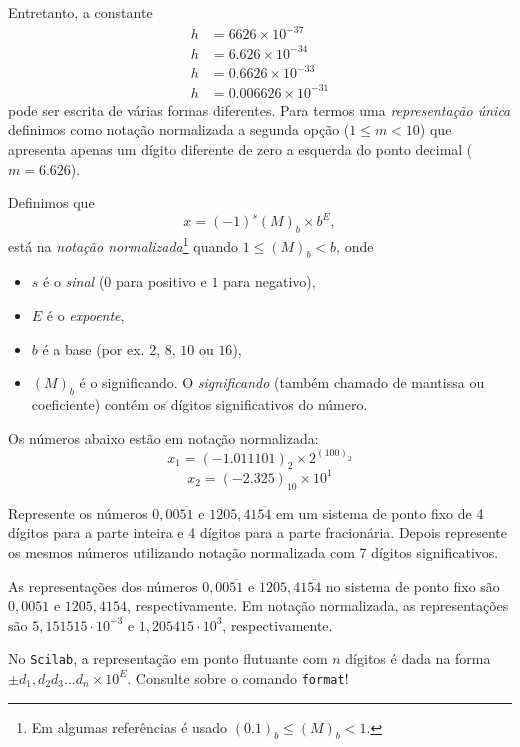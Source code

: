 \documentclass[main.tex]{subfiles}
\begin{document}
Entretanto, a constante
\begin{align*}
   h &=6626  \times 10^{-37} \\
   h &=6.626  \times 10^{-34} \\
   h &=0.6626 \times 10^{-33} \\
   h &=0.006626\times 10^{-31}
\end{align*}
pode ser escrita de várias formas diferentes. Para termos uma \emph{representação única} definimos como notação normalizada a segunda opção ($1 \leq m <10$)
que apresenta apenas um dígito  diferente de zero  a esquerda do ponto decimal ($m=6.626$).

\begin{defn}
Definimos que 
 $$ x=(-1)^{s}(M)_b \times b^{E}, $$
está na \emph{notação normalizada}\footnote{Em algumas referências é usado $(0.1)_b\leq (M)_b <1$.} quando $1\leq (M)_{b}<b$, onde
\begin{itemize}
 \item $s$ é o \emph{sinal} ($0$ para positivo e $1$ para negativo),
 \item $E$ é o \emph{expoente},
 \item $b$ é a base (por ex. $2$, $8$, $10$ ou $16$),
 \item $(M)_b$ é o significando. O \emph{significando} (também chamado de mantissa ou coeficiente) contém os dígitos significativos do número.
\end{itemize}
 
\end{defn}


\begin{ex}
  Os números abaixo estão em notação normalizada:
  $$x_1=(-1.011101)_2\times 2^{(100)_2}$$
  $$x_2=(-2.325)_{10}\times  10^{1}$$
\end{ex}

\begin{ex}Represente os números $0,00\overline{51}$ e $1205,41\overline{54}$ em um sistema de ponto fixo de 4 dígitos para a parte inteira e 4 dígitos para a parte fracionária. Depois represente os mesmos números utilizando notação normalizada com 7 dígitos significativos.
\end{ex}
\begin{sol} As representações dos números $0,00\overline{51}$ e $1205,41\overline{54}$ no sistema de ponto fixo são $0,0051$ e $1205,4154$, respectivamente. Em notação normalizada, as representações são $5,151515\cdot 10^{-3}$ e $1,205415 \cdot 10^{3}$, respectivamente.
\end{sol}
\ifisscilab
\begin{obs}
  No \verb+Scilab+, a representação em ponto flutuante com $n$ dígitos é dada na forma $\pm d_1,d_2d_3\ldots d_n\times 10^{E}$. Consulte sobre o comando \verb'format'!
\end{obs}
\fi
\end{document}
